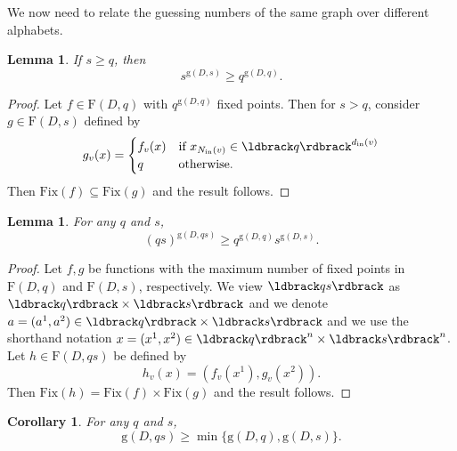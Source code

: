 \documentclass[a4paper, 11pt]{book}
\numberwithin{equation}{section}
\theoremstyle{plain}
\newtheorem{corollary}	[equation]	{Corollary}
\newtheorem{lemma}		[equation]	{Lemma}
\newcommand{\neighbourhood}{N}
\newcommand{\degree}{d}
\newcommand{\inn}[1]{#1_\mathrm{in}}
\newcommand{\NIn}{\inn{\neighbourhood}}
\newcommand{\dIn}{\inn{\degree}}
\newcommand{\functions}{\mathrm{F}}
\newcommand{\Fix}{\mathrm{Fix}}
\newcommand{\guessing}{\mathrm{g}}
\renewcommand{\(}{\ldbrack}
\renewcommand{\)}{\rdbrack}
\begin{document}
We now need to relate the guessing numbers of the same graph over different alphabets.

\begin{lemma} \label{lem:g(D,s)>g(D,q)}
If $s \ge q$, then 
\[
	s^{\guessing(D, s)} \ge q^{\guessing(D,q)}.
\]
\end{lemma}

\begin{proof}
Let $f \in \functions(D,q)$ with $q^{\guessing(D,q)}$ fixed points. Then for $s > q$, consider $g \in \functions(D,s)$ defined by
\[
	g_v(x) = \begin{cases}
	f_v(x) &\text{if } x_{\NIn(v)} \in \(q\)^{\dIn(v)}\\
	q & \text{otherwise}.
	\end{cases}
\]
Then $\Fix(f) \subseteq \Fix(g)$ and the result follows.
\end{proof}




\begin{lemma} \label{lem:g(qs)}
For any $q$ and $s$,
\[
	(qs)^{\guessing(D, qs)} \ge q^{\guessing(D,q)} s^{\guessing(D, s)}.
\]
\end{lemma}

\begin{proof}
Let $f,g$ be functions with the maximum number of fixed points in $\functions(D,q)$ and $\functions(D,s)$, respectively. We view $\(qs\)$ as $\(q\) \times \(s\)$ and we denote $a = (a^1, a^2) \in \(q\) \times \(s\)$ and we use the shorthand notation $x = (x^1, x^2) \in \(q\)^n \times \(s\)^n$. Let $h \in \functions(D,qs)$ be defined by
\[
	h_v(x) = (f_v(x^1), g_v(x^2)).
\]
Then $\Fix(h) = \Fix(f) \times \Fix(g)$ and the result follows.
\end{proof}


\begin{corollary} \label{cor:g(qs)}
For any $q$ and $s$,
\[
	\guessing(D, qs) \ge \min\{ \guessing(D, q), \guessing(D, s) \}.
\]
\end{corollary}
\end{document}
